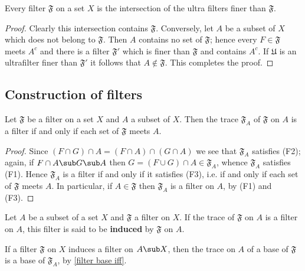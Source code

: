 \begin{proposition}\label{filter is intersection of finer ultrafilter}
Every filter $\mathfrak{F}$ on a set $X$ is the intersection of the ultra filters finer than $\mathfrak{F}$.
\end{proposition}
\begin{proof}
Clearly this intersection contains $\mathfrak{F}$. Conversely, let $A$ be a subset of $X$ which does not belong to $\mathfrak{F}$. Then $A$ contains no set of $\mathfrak{F}$; hence every $F\in\mathfrak{F}$ meets $A^c$ and there is a filter $\mathfrak{F}'$ which is finer than $\mathfrak{F}$ and contains $A^c$. If $\mathfrak{U}$ is an ultrafilter finer than $\mathfrak{F}'$ it follows that $A\notin\mathfrak{F}$. This completes the proof.
\end{proof}
\subsection{Construction of filters}
\begin{proposition}\label{filter trace is filter iff}
Let $\mathfrak{F}$ be a filter on a set $X$ and $A$ a subset of $X$. Then the trace $\mathfrak{F}_A$ of $\mathfrak{F}$ on $A$ is a filter if and only if each set of $\mathfrak{F}$ meets $A$.
\end{proposition}
\begin{proof}
Since $(F\cap G)\cap A=(F\cap A)\cap (G\cap A)$ we see that $\mathfrak{F}_A$ satisfies (F2); again, if $F\cap A\sub G\sub A$ then $G=(F\cup G)\cap A\in\mathfrak{F}_A$, whence $\mathfrak{F}_A$ satisfies (F1). Hence $\mathfrak{F}_A$ is a filter if and only if it satisfies (F3), i.e. if and only if each set of $\mathfrak{F}$ meets $A$. In particular, if $A\in\mathfrak{F}$ then $\mathfrak{F}_A$ is a filter on $A$, by (F1) and (F3).
\end{proof}
\begin{definition}
Let $A$ be a subset of a set $X$ and $\mathfrak{F}$ a filter on $X$. If the trace of $\mathfrak{F}$ on $A$ is a filter on $A$, this filter is said to be \textbf{induced} by $\mathfrak{F}$ on $A$.
\end{definition}
If a filter $\mathfrak{F}$ on $X$ induces a filter on $A\sub X$, then the trace on $A$ of a base of $\mathfrak{F}$ is a base of $\mathfrak{F}_A$, by \cref{filter base iff}.

